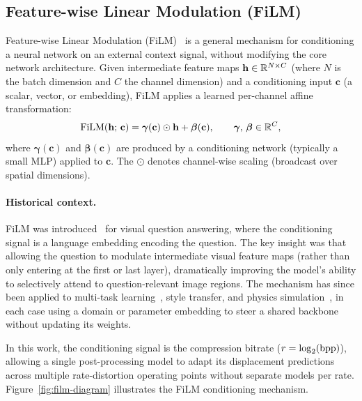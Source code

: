 \subsection{Feature-wise Linear Modulation (FiLM)}
\label{ssec:film}

Feature-wise Linear Modulation (FiLM)~\cite{perez2018film} is a general
mechanism for conditioning a neural network on an external context signal,
without modifying the core network architecture.
Given intermediate feature maps $\mathbf{h} \in \mathbb{R}^{N \times C}$ (where $N$
is the batch dimension and $C$ the channel dimension) and a conditioning input
$\mathbf{c}$ (a scalar, vector, or embedding), FiLM applies a learned
per-channel affine transformation:
\begin{equation}
  \text{FiLM}(\mathbf{h};\,\mathbf{c}) = \boldsymbol{\gamma}(\mathbf{c}) \odot \mathbf{h}
    + \boldsymbol{\beta}(\mathbf{c}),
  \qquad \boldsymbol{\gamma},\, \boldsymbol{\beta} \in \mathbb{R}^C,
\end{equation}
where $\boldsymbol{\gamma}(\mathbf{c})$ and $\boldsymbol{\beta}(\mathbf{c})$
are produced by a conditioning network (typically a small MLP) applied to $\mathbf{c}$.
The $\odot$ denotes channel-wise scaling (broadcast over spatial dimensions).

\paragraph{Historical context.}
FiLM was introduced~\cite{perez2018film} for visual question answering, where
the conditioning signal is a language embedding encoding the question.
The key insight was that allowing the question to modulate intermediate visual
feature maps (rather than only entering at the first or last layer),
dramatically improving the model's ability to selectively attend to question-relevant
image regions.
The mechanism has since been applied to multi-task
learning~\cite{rebuffi2018efficient}, style transfer, and physics
simulation~\cite{gupta2023pde}, in each case using a domain or parameter
embedding to steer a shared backbone without updating its weights.

In this work, the conditioning signal is the compression bitrate
($r = \log_2(\mathrm{bpp})$), allowing a single post-processing model to adapt its
displacement predictions across multiple rate-distortion operating points
without separate models per rate.
Figure~\ref{fig:film-diagram} illustrates the FiLM conditioning mechanism.

